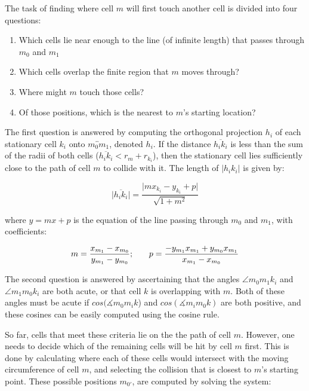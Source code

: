 \documentclass[12pt]{article}
\begin{document}
The task of finding where cell \(m\) will first touch another 
cell is divided into four questions:

\begin{enumerate}
\item Which cells lie near enough to the line (of infinite length) that 
passes through \(m_0\) and \(m_1\)
\item Which cells overlap the finite region that \(m\) moves 
through?
\item Where might \(m\) touch those cells?
\item Of those positions, which is the nearest to \(m\)'s 
starting location?
\end{enumerate}

The first question is answered by computing the orthogonal projection \(h_i\) of 
each stationary cell \(k_i\) onto \(\overleftrightarrow{m_0m_1}\), denoted 
\(h_i\). If the distance \(\overline{h_ik_i}\) is less than the sum of the 
radii of both cells (\(\overline{h_ik_i} < r_m + r_{k_i}\)), then the 
stationary cell lies sufficiently close to the path of cell \(m\) to collide 
with it. The length of \(\lvert h_ik_i \rvert\) is given by:

\begin{equation}
\lvert\overline{h_ik_i}\rvert = \frac{\lvert {mx_{k_i} - y_{k_i} + p}\rvert }{\sqrt{1+m^2}}
\end{equation}

where \(y = mx + p\) is the equation of the line passing through \(m_0\)
and \(m_1\), with coefficients:

\begin{equation}
  m = \frac{x_{m_1}-x_{m_0}}{y_{m_1}-y_{m_0}}\text; \qquad p = \frac{-y_{m_1}x_{m_1}+y_{m_0}x_{m_1}}{x_{m_1}-x_{m_0}}
\end{equation}

The second question is answered by ascertaining that the angles \(\angle m_0m_1k_i\) 
and \(\angle m_1m_0k_i\) are both acute, or that 
cell \(k\) is overlapping with \(m\). Both of these angles 
must be acute if \(cos(\measuredangle m_0m_ik\)) and \(cos(\measuredangle m_im_0k)\) are 
both positive, and these cosines can be easily computed 
using the cosine rule.

So far, cells that meet these criteria lie on the the path of cell 
\(m\). However, one needs to decide which of the remaining cells
will be hit by cell \(m\) first. This is done by 
calculating where each of these cells would intersect with the moving 
circumference of cell \(m\), and selecting the collision that is closest to 
\(m\)'s starting point. These possible positions \(m_{0'}\), 
are computed by solving the system:
\end{document}
